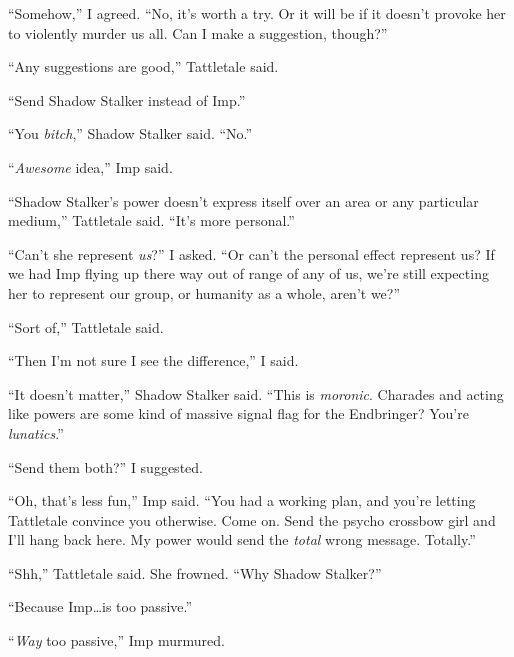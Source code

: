 ``Somehow,'' I agreed.  ``No, it's worth a try.  Or it will be if it doesn't provoke her to violently murder us all.  Can I make a suggestion, though?''



``Any suggestions are good,'' Tattletale said.



``Send Shadow Stalker instead of Imp.''



``You \emph{bitch},'' Shadow Stalker said.  ``No.''



``\emph{Awesome }idea,'' Imp said.



``Shadow Stalker's power doesn't express itself over an area or any particular medium,'' Tattletale said.  ``It's more personal.''



``Can't she represent \emph{us}?''  I asked.  ``Or can't the personal effect represent us?  If we had Imp flying up there way out of range of any of us, we're still expecting her to represent our group, or humanity as a whole, aren't we?''



``Sort of,'' Tattletale said.



``Then I'm not sure I see the difference,'' I said.



``It doesn't matter,'' Shadow Stalker said.  ``This is \emph{moronic}.  Charades and acting like powers are some kind of massive signal flag for the Endbringer?  You're \emph{lunatics}.''



``Send them both?'' I suggested.



``Oh, that's less fun,'' Imp said.  ``You had a working plan, and you're letting Tattletale convince you otherwise.  Come on.  Send the psycho crossbow girl and I'll hang back here.  My power would send the \emph{total} wrong message.  Totally.''



``Shh,'' Tattletale said.  She frowned.  ``Why Shadow Stalker?''



``Because Imp\ldots is too passive.''



``\emph{Way} too passive,'' Imp murmured.



